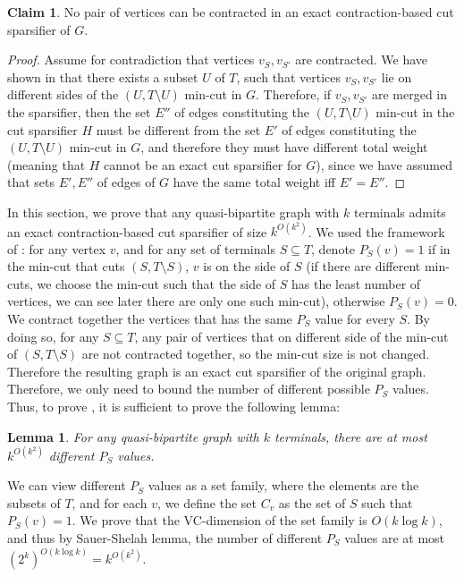 \documentclass[11pt]{article}
\newtheorem{lemma}[theorem]{Lemma}
\theoremstyle{definition}
\newtheorem{claim}[theorem]{Claim}
\newcounter{note}
\begin{document}
\begin{claim}
No pair of vertices can be contracted in an exact contraction-based cut sparsifier of $G$.
\end{claim}
\begin{proof}
Assume for contradiction that vertices $v_S,v_{S'}$ are contracted. We have shown in  that there exists a subset $U$ of $T$, such that vertices $v_S,v_{S'}$ lie on different sides of the $(U,T\setminus U)$ min-cut in $G$.
Therefore, if $v_S,v_{S'}$ are merged in the sparsifier, then the set $E''$ of edges constituting the $(U,T\setminus U)$ min-cut in the cut sparsifier $H$ must be different from the set $E'$ of edges constituting the $(U,T\setminus U)$ min-cut in $G$, and therefore they must have different total weight (meaning that $H$ cannot be an exact cut sparsifier for $G$), since we have assumed that sets $E',E''$ of edges of $G$ have the same total weight iff $E'=E''$.
\end{proof}









\iffalse
In this section, we prove that any quasi-bipartite graph with $k$ terminals admits an exact contraction-based cut sparsifier of size $k^{O(k^2)}$. We used the framework of \cite{khan2014mimicking}: for any vertex $v$, and for any set of terminals $S \subseteq T$, denote $P_S(v)=1$ if in the min-cut that cuts $(S,T \setminus S)$, $v$ is on the side of $S$ (if there are different min-cuts, we choose the min-cut such that the side of $S$ has the least number of vertices, we can see later there are only one such min-cut), otherwise $P_S(v)=0$. We contract together the vertices that has the same $P_S$ value for every $S$. By doing so, for any $S \subseteq T$, any pair of vertices that on different side of the min-cut of $(S, T \setminus S)$ are not contracted together, so the min-cut size is not changed. Therefore the resulting graph is an exact cut sparsifier of the original graph. Therefore, we only need to bound the number of different possible $P_S$ values. Thus, to prove , it is sufficient to prove the following lemma:

\begin{lemma} \label{quasi_profile}
    For any quasi-bipartite graph with $k$ terminals, there are at most $k^{O(k^2)}$ different $P_S$ values.
\end{lemma}

We can view different $P_S$ values as a set family, where the elements are the subsets of $T$, and for each $v$, we define the set $C_v$ as the set of $S$ such that $P_S(v)=1$. We prove that the VC-dimension of the set family is $O(k \log k)$, and thus by Sauer-Shelah lemma, the number of different $P_S$ values are at most $(2^k)^{O(k \log k)} = k^{O(k^2)}$.  
\end{document}
